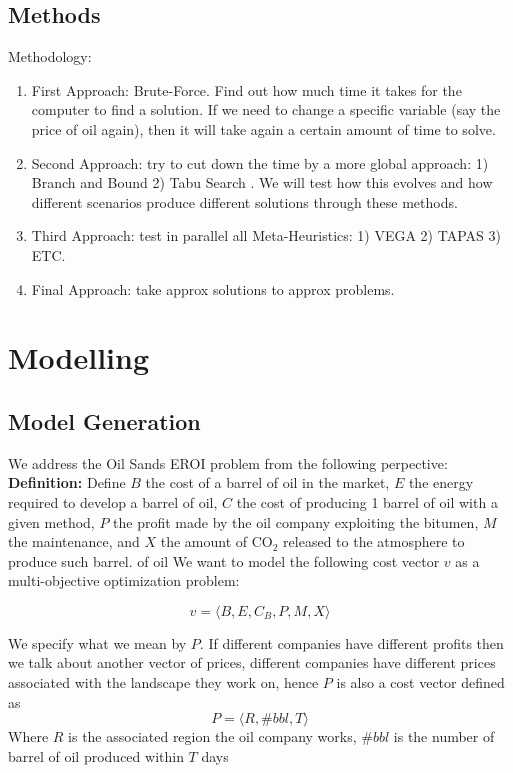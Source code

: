 \documentclass[12pt]{article}
\begin{document}
\subsection{Methods}

Methodology:
\begin{enumerate}
\item First Approach: Brute-Force. Find out how much time it takes for the computer to find a solution. If we need to change a specific variable (say the price of oil again), then it will take again a certain amount of time to solve. 
\item Second Approach: try to cut down the time by a more global approach: 1) Branch and Bound 2) Tabu Search . We will test how this evolves and how different scenarios produce different solutions through these methods. 
\item Third Approach: test in parallel all Meta-Heuristics: 1) VEGA 2) TAPAS 3) ETC. 
\item Final Approach: take approx solutions to approx problems. 
\end{enumerate}


\section{Modelling}

\subsection{Model Generation}

We address the Oil Sands EROI problem from the following perpective: \\

{\bf Definition:} Define $B$ the cost of a barrel of oil in the market, $E$ the energy required to develop a barrel of oil, $C$ the cost of producing 1 barrel of oil with a given method, $P$ the profit made by the oil company exploiting the bitumen,  $M$ the maintenance, and $X$ the amount of CO$_2$ released to the atmosphere to produce such barrel. of oil We want to model the following cost vector $v$ as a multi-objective optimization problem:

\begin{displaymath}
v = \langle B, E, C_B, P,  M, X \rangle
\end{displaymath}

We specify what we mean by $P$. If different companies have different profits then we talk about another vector of prices, different companies have different prices associated with the landscape they work on, hence $P$ is also a cost vector defined as 
\begin{displaymath}
P = \langle R, \#bbl, T \rangle
\end{displaymath}
Where $R$ is the associated region the oil company works, $\#bbl$ is the number of barrel of oil produced within $T$ days
\end{document}
